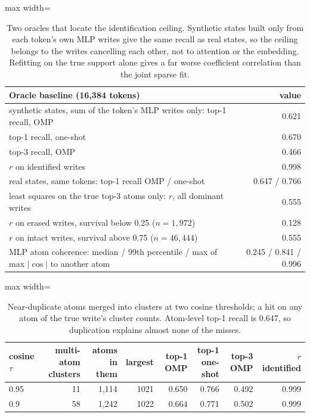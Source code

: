 \begin{table}[H]\centering\small
\caption{Two oracles that locate the identification ceiling. Synthetic states built only from each token's own MLP writes give the same recall as real states, so the ceiling belongs to the writes cancelling each other, not to attention or the embedding. Refitting on the true support alone gives a far worse coefficient correlation than the joint sparse fit.}\label{app:oracle}
\begin{adjustbox}{max width=\linewidth}
\begin{tabular}{lr}\toprule
Oracle baseline (16,384 tokens) & value \\ \midrule
synthetic states, sum of the token's MLP writes only: top-1 recall, OMP & 0.621 \\
\quad top-1 recall, one-shot & 0.670 \\
\quad top-3 recall, OMP & 0.466 \\
\quad $r$ on identified writes & 0.998 \\
real states, same tokens: top-1 recall OMP / one-shot & 0.647 / 0.766 \\
least squares on the true top-3 atoms only: $r$, all dominant writes & 0.555 \\
\quad $r$ on erased writes, survival below 0.25 ($n=1,972$) & 0.128 \\
\quad $r$ on intact writes, survival above 0.75 ($n=46,444$) & 0.555 \\
MLP atom coherence: median / 99th percentile / max of max $|\cos|$ to another atom & 0.245 / 0.841 / 0.996 \\
\bottomrule\end{tabular}\end{adjustbox}
\end{table}
\begin{table}[H]\centering\footnotesize
\caption{Near-duplicate atoms merged into clusters at two cosine thresholds; a hit on any atom of the true write's cluster counts. Atom-level top-1 recall is 0.647, so duplication explains almost none of the misses.}\label{app:clusters}
\begin{adjustbox}{max width=\linewidth}
\begin{tabular}{lrrrrrrr}\toprule
cosine $\tau$ & multi-atom clusters & atoms in them & largest & top-1 OMP & top-1 one-shot & top-3 OMP & $r$ identified \\ \midrule
0.95 & 11 & 1,114 & 1021 & 0.650 & 0.766 & 0.492 & 0.999 \\
0.9 & 58 & 1,242 & 1022 & 0.664 & 0.771 & 0.502 & 0.999 \\
\bottomrule\end{tabular}\end{adjustbox}
\end{table}
